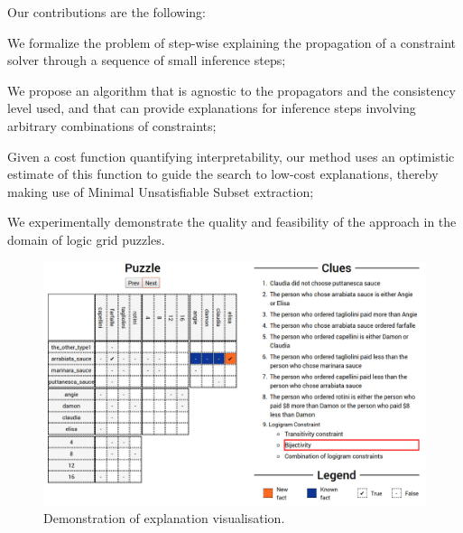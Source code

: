 \noindent Our contributions are the following:
\begin{compactitem}
	\item We formalize the problem of step-wise explaining the propagation of a constraint solver through a sequence of small inference steps;
	\item We propose an algorithm that is agnostic to the propagators and the consistency level used, and that can provide explanations for inference steps involving arbitrary combinations of constraints;
	\item Given a cost function quantifying interpretability, our method uses an optimistic estimate of this function to guide the search to low-cost explanations, thereby making use of Minimal Unsatisfiable Subset extraction;
	\item We experimentally demonstrate the quality and feasibility of the approach in the domain of logic grid puzzles.
\end{compactitem}



\begin{figure}[t]
\centering
\includegraphics[width=1\linewidth]{zebra_screen}
\caption{Demonstration of explanation visualisation.}
\label{fig:zebrascreen}
\end{figure}

